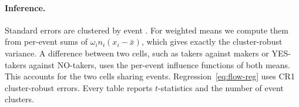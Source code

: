 \paragraph{Inference.} Standard errors are clustered by event \citep{cameronmiller2015}. For
weighted means we compute them from per-event sums of $\omega_in_i(x_i-\bar x)$, which gives
exactly the cluster-robust variance. A difference between two cells, such as takers against
makers or YES-takers against NO-takers, uses the per-event influence functions of both means.
This accounts for the two cells sharing events. Regression~\eqref{eq:flow-reg} uses CR1
cluster-robust errors. Every table reports $t$-statistics and the number of event clusters.
